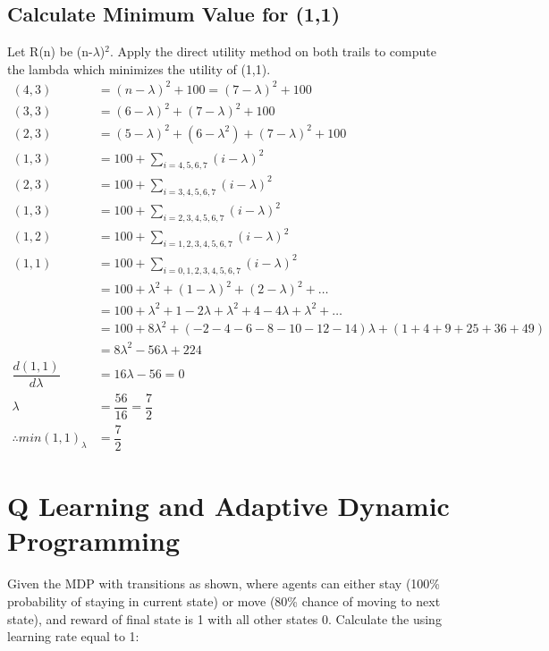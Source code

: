 \documentclass[a4paper]{article}
\begin{document}
\subsection{Calculate Minimum Value for (1,1)\\}
\label{sec-1-2}
Let R(n) be (n-$\lambda$)$^{\text{2}}$. Apply the direct utility method on both trails to compute
the lambda which minimizes the utility of (1,1). \\
\begin{align*}
      (4,3) &= (n - \lambda)^2 + 100 = (7 -\lambda)^2 + 100\\
      (3,3) &= (6 - \lambda)^2 + (7-\lambda)^2 + 100\\
      (2,3) &= (5 - \lambda)^2 + (6 - \lambda ^2) + (7-\lambda)^2 + 100\\
      (1,3) &= 100 + \sum_{i=4,5,6,7} (i - \lambda)^2\\
      (2,3) &= 100 + \sum_{i=3,4,5,6,7} (i - \lambda)^2\\
      (1,3) &= 100 +  \sum_{i=2,3,4,5,6,7} (i - \lambda)^2\\
      (1,2) &= 100 +  \sum_{i=1,2,3,4,5,6,7} (i - \lambda)^2\\
      (1,1) &=  100 +  \sum_{i=0,1,2,3,4,5,6,7} (i - \lambda)^2\\
             &= 100 + \lambda^2 + (1 - \lambda)^2 + (2 - \lambda)^2  + \ldots\\
             &= 100 + \lambda^2 + 1 - 2\lambda + \lambda^2 + 4 - 4\lambda + \lambda^2 + \ldots\\
             &= 100 + 8\lambda^2 + (-2 -4 -6 -8 -10 -12 -14) \lambda + (1 + 4 + 9 + 25 + 36 + 49)\\
             &= 8\lambda^2 - 56 \lambda + 224\\
      \dfrac{d(1,1)}{d\lambda} &= 16\lambda - 56 = 0\\
      \lambda &= \dfrac{56}{16} = \dfrac{7}{2}\\
      \therefore min(1,1)_{\lambda} &= \dfrac{7}{2}
\end{align*}

\section{Q Learning and Adaptive Dynamic Programming\\}
\label{sec-2}
Given the MDP with transitions as shown, where agents can either stay
 (100\% probability of staying in current state) or move (80\% chance of moving to next state),
 and reward of final state is 1 with all other states 0. Calculate the using learning rate equal to 1:\\
\end{document}

